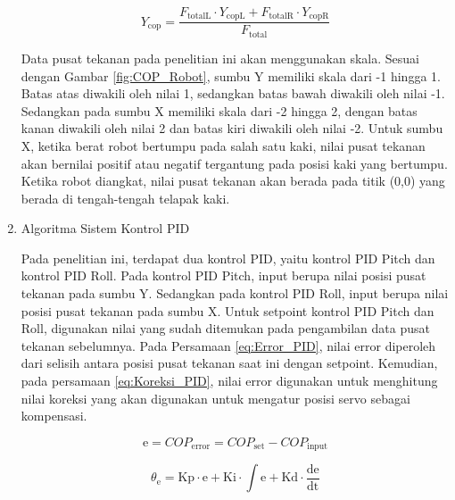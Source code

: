\begin{enumerate}[label=\Alph*.]
    \begin{equation}
      Y_{\mathrm{cop}} = \frac{F_{\mathrm{totalL}} \cdot Y_{\mathrm{copL}} + F_{\mathrm{totalR}} \cdot Y_{\mathrm{copR}}}{F_{\mathrm{total}}}
      \label{eq:COP_Y_Robot}
    \end{equation}

    \hspace*{1em} Data pusat tekanan pada penelitian ini akan menggunakan skala. Sesuai dengan Gambar \ref{fig:COP_Robot}, sumbu Y memiliki skala dari -1 hingga 1. Batas atas diwakili oleh nilai 1, sedangkan batas bawah diwakili oleh nilai -1. Sedangkan pada sumbu X memiliki skala dari -2 hingga 2, dengan batas kanan diwakili oleh nilai 2 dan batas kiri diwakili oleh nilai -2. Untuk sumbu X, ketika berat robot bertumpu pada salah satu kaki, nilai pusat tekanan akan bernilai positif atau negatif tergantung pada posisi kaki yang bertumpu. Ketika robot diangkat, nilai pusat tekanan akan berada pada titik (0,0) yang berada di tengah-tengah telapak kaki. 

    \item Algoritma Sistem Kontrol PID
    \label{subsec:algoritmakontrolpid}

    \hspace*{1em} Pada penelitian ini, terdapat dua kontrol PID, yaitu kontrol PID Pitch dan kontrol PID Roll. Pada kontrol PID Pitch, input berupa nilai posisi pusat tekanan pada sumbu Y. Sedangkan pada kontrol PID Roll, input berupa nilai posisi pusat tekanan pada sumbu X. Untuk setpoint kontrol PID Pitch dan Roll, digunakan nilai yang sudah ditemukan pada pengambilan data pusat tekanan sebelumnya. Pada Persamaan \ref{eq:Error_PID}, nilai error diperoleh dari selisih antara posisi pusat tekanan saat ini dengan setpoint. Kemudian, pada persamaan \ref{eq:Koreksi_PID}, nilai error digunakan untuk menghitung nilai koreksi yang akan digunakan untuk mengatur posisi servo sebagai kompensasi.

    \begin{equation}
      \mathrm{e} = COP_{\mathrm{error}} = COP_{\mathrm{set}} - COP_{\mathrm{input}}
      \label{eq:Error_PID}
    \end{equation}

    \begin{equation}
      \theta_\mathrm{e} = \mathrm{Kp} \cdot \mathrm{e} + \mathrm{Ki} \cdot \int \mathrm{e} + \mathrm{Kd} \cdot \frac{\mathrm{de}}{\mathrm{dt}}
      \label{eq:Koreksi_PID}
    \end{equation}


\end{enumerate}
